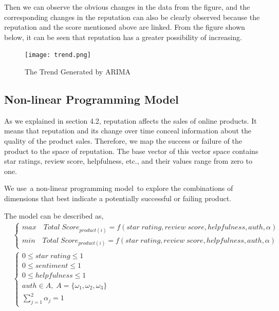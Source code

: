 \documentclass[12pt]{article}  %
\begin{document}
Then we can observe the obvious changes in the data from the figure, and the corresponding changes in the reputation can also be clearly observed because the reputation and the score mentioned above are linked. From the figure shown below, it can be seen that reputation has a greater possibility of increasing.

\begin{figure}[htbp]
	\centering
	\texttt{[image: trend.png]}
	\caption{The Trend Generated by ARIMA}\label{fig:fig12}
\end{figure} 

\subsection{Non-linear Programming Model}
As we explained in section 4.2, reputation affects the sales of online products. It means that reputation and its change over time conceal information about the quality of the product sales.  Therefore, we map the success or failure of the product to the space of reputation. The base vector of this vector space contains star ratings, review score, helpfulness, etc., and their values range from zero to one. 

We use a non-linear programming model to explore the combinations of dimensions that best indicate a potentially successful or failing product.

The model can be described as,
\begin{equation}\label{eq:model4.3}
\begin{aligned}
&\begin{cases}
max \quad Total \;Score_{product(i)} = f(star \;rating,review\;score,helpfulness,auth,\alpha)
\\[2ex]min \quad Total \;Score_{product(i)} = f(star \;rating,review\;score,helpfulness,auth,\alpha)
\end{cases}\\[2ex]
&\begin{cases}
0 \leq star\; rating \leq 1\\[2ex]
0 \leq sentiment \leq 1\\[2ex]
0 \leq helpfulness \leq 1\\[2ex]
auth \in A,\; A=\{\omega_1,\omega_2,\omega_3\}\\[2ex]
\sum\limits_{j=1}^{2}\alpha_j=1
\end{cases}
\end{aligned}
\end{equation}
\end{document}
